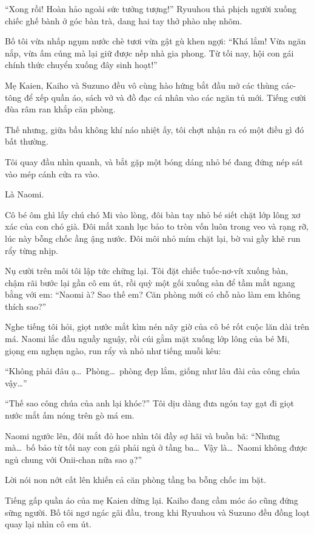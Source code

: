 ﻿\documentclass[../main.tex]{subfiles}
\begin{document}
``Xong rồi! Hoàn hảo ngoài sức tưởng tượng!'' Ryuuhou thả phịch người xuống chiếc ghế bành ở góc bàn trà, dang hai tay thở phào nhẹ nhõm.

Bố tôi vừa nhấp ngụm nước chè tươi vừa gật gù khen ngợi: ``Khá lắm! Vừa ngăn nắp, vừa ấm cúng mà lại giữ được nếp nhà gia phong. Từ tối nay, hội con gái chính thức chuyển xuống đây sinh hoạt!''

Mẹ Kaien, Kaiho và Suzuno đều vô cùng hào hứng bắt đầu mở các thùng các-tông để xếp quần áo, sách vở và đồ đạc cá nhân vào các ngăn tủ mới. Tiếng cười đùa râm ran khắp căn phòng.

Thế nhưng, giữa bầu không khí náo nhiệt ấy, tôi chợt nhận ra có một điều gì đó bất thường.

Tôi quay đầu nhìn quanh, và bắt gặp một bóng dáng nhỏ bé đang đứng nép sát vào mép cánh cửa ra vào.

Là Naomi.

Cô bé ôm ghì lấy chú chó Mi vào lòng, đôi bàn tay nhỏ bé siết chặt lớp lông xơ xác của con chó già. Đôi mắt xanh lục bảo to tròn vốn luôn trong veo và rạng rỡ, lúc này bỗng chốc ầng ậng nước. Đôi môi nhỏ mím chặt lại, bờ vai gầy khẽ run rẩy từng nhịp.

Nụ cười trên môi tôi lập tức chững lại. Tôi đặt chiếc tuốc-nơ-vít xuống bàn, chậm rãi bước lại gần cô em út, rồi quỳ một gối xuống sàn để tầm mắt ngang bằng với em: ``Naomi à? Sao thế em? Căn phòng mới có chỗ nào làm em không thích sao?''

Nghe tiếng tôi hỏi, giọt nước mắt kìm nén nãy giờ của cô bé rốt cuộc lăn dài trên má. Naomi lắc đầu nguầy nguậy, rồi cúi gằm mặt xuống lớp lông của bé Mi, giọng em nghẹn ngào, run rẩy và nhỏ như tiếng muỗi kêu:

``Không phải đâu ạ\dots\ Phòng\dots\ phòng đẹp lắm, giống như lâu đài của công chúa vậy\dots''

``Thế sao công chúa của anh lại khóc?'' Tôi dịu dàng đưa ngón tay gạt đi giọt nước mắt ấm nóng trên gò má em.

Naomi ngước lên, đôi mắt đỏ hoe nhìn tôi đầy sợ hãi và buồn bã: ``Nhưng mà\dots\ bố bảo từ tối nay con gái phải ngủ ở tầng ba\dots\ Vậy là\dots\ Naomi không được ngủ chung với Onii-chan nữa sao ạ?''

Lời nói non nớt cất lên khiến cả căn phòng tầng ba bỗng chốc im bặt.

Tiếng gấp quần áo của mẹ Kaien dừng lại. Kaiho đang cầm móc áo cũng đứng sững người. Bố tôi ngơ ngác gãi đầu, trong khi Ryuuhou và Suzuno đều đồng loạt quay lại nhìn cô em út.
\end{document}
